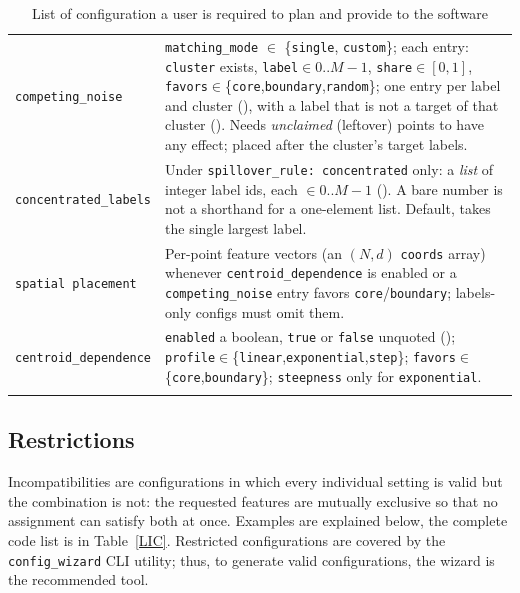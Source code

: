 \documentclass[a4paper,11pt]{article}
\newcommand{\vcode}[1]{\textcolor{valred}{\bfseries\ttfamily #1}}
\begin{document}
\begin{longtable}{@{}L{4.2cm} L{12.0cm}@{}}
\texttt{competing\_noise} & \texttt{matching\_mode} $\in$ \{\texttt{single}, \texttt{custom}\}; each entry: \texttt{cluster} exists, \texttt{label}$\in 0..M{-}1$, \texttt{share}$\in[0,1]$, \texttt{favors}$\in$\{\texttt{core},\texttt{boundary},\texttt{random}\}; one entry per label and cluster (\vcode{142}), with a label that is not a target of that cluster (\vcode{144}). Needs \emph{unclaimed} (leftover) points to have any effect; placed after the cluster's target labels. \\
\texttt{concentrated\_labels} & Under \texttt{spillover\_rule: concentrated} only: a \emph{list} of integer label ids, each $\in 0..M{-}1$ (\vcode{128}). A bare number is not a shorthand for a one-element list. Default, takes the single largest label. \\
\texttt{spatial placement} & Per-point feature vectors (an $(N,d)$ \texttt{coords} array) whenever \texttt{centroid\_dependence} is enabled or a \texttt{competing\_noise} entry favors \texttt{core}/\texttt{boundary}; labels-only configs must omit them. \\
\texttt{centroid\_dependence} & \texttt{enabled} a boolean, \texttt{true} or \texttt{false} unquoted (\vcode{141}); \texttt{profile}$\in$\{\texttt{linear},\texttt{exponential},\texttt{step}\}; \texttt{favors}$\in$\{\texttt{core},\texttt{boundary}\}; \texttt{steepness} only for \texttt{exponential}. \\
\bottomrule
\caption{List of configuration a user is required to plan and provide to the software}
\end{longtable}

\subsection{Restrictions}

Incompatibilities are configurations in which every individual setting is valid but the combination is not: the requested features are mutually exclusive so that no assignment can satisfy both at once. Examples are explained below, the complete code list is in Table~\ref{LIC}. Restricted configurations are covered by the \texttt{config\_wizard} CLI utility; thus, to generate valid configurations, the wizard is the recommended tool.
\end{document}
